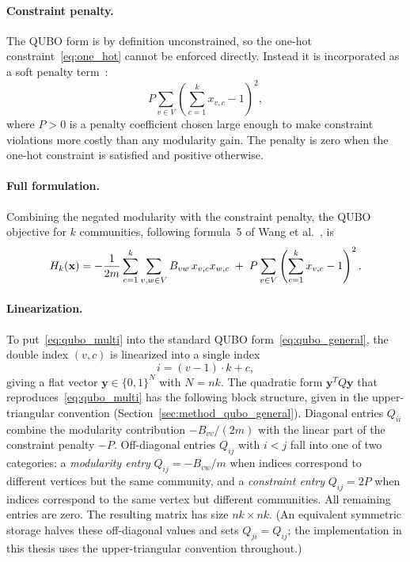 \paragraph{Constraint penalty.}
The QUBO form is by definition unconstrained, so the one-hot
constraint~\eqref{eq:one_hot} cannot be enforced directly. Instead
it is incorporated as a soft penalty term~\cite{lucas2014ising}:
\begin{equation*}
    P \sum_{v \in V} \left( \sum_{c=1}^{k} x_{v,c} - 1 \right)^2,
\end{equation*}
where $P > 0$ is a penalty coefficient chosen large enough to make
constraint violations more costly than any modularity gain. The
penalty is zero when the one-hot constraint is satisfied and
positive otherwise.

\paragraph{Full formulation.}
Combining the negated modularity with the constraint penalty, the
QUBO objective for $k$ communities, following formula~5 of Wang et
al.~\cite{wang2024quantum}, is
\begin{equation}
    H_k(\mathbf{x}) = -\frac{1}{2m} \sum_{c=1}^{k} \sum_{v,w \in V} B_{vw} \,
    x_{v,c} x_{w,c} \;+\; P \sum_{v \in V} \left(
    \sum_{c=1}^{k} x_{v,c} - 1 \right)^2.
    \label{eq:qubo_multi}
\end{equation}

\paragraph{Linearization.}
To put~\eqref{eq:qubo_multi} into the standard QUBO
form~\eqref{eq:qubo_general}, the double index $(v, c)$ is
linearized into a single index
\begin{equation}
    i = (v - 1) \cdot k + c,
    \label{eq:linearization}
\end{equation}
giving a flat vector $\mathbf{y} \in \{0, 1\}^N$ with $N = nk$. The
quadratic form $\mathbf{y}^T Q \mathbf{y}$ that
reproduces~\eqref{eq:qubo_multi} has the following block
structure, given in the upper-triangular convention
(Section~\ref{sec:method_qubo_general}). Diagonal entries
$Q_{ii}$ combine the modularity contribution $-B_{vv} / (2m)$
with the linear part of the constraint penalty $-P$. Off-diagonal
entries $Q_{ij}$ with $i < j$ fall into one of two categories: a
\emph{modularity entry} $Q_{ij} = -B_{vw} / m$ when indices
correspond to different vertices but the same community, and a
\emph{constraint entry} $Q_{ij} = 2P$ when indices correspond to
the same vertex but different communities. All remaining entries
are zero. The resulting matrix has size $nk \times nk$. (An
equivalent symmetric storage halves these off-diagonal values and
sets $Q_{ji} = Q_{ij}$; the implementation in this thesis uses
the upper-triangular convention throughout.)

